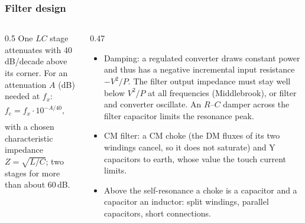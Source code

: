 \begin{frame}
	\frametitle{Filter design}
	\begin{columns}[T]
		\begin{column}{0.5\textwidth}
			\footnotesize
			One $LC$ stage attenuates with 40\,dB/decade above its corner. For an attenuation $A$ (dB) needed at $f_x$:
			\begin{equation*}
				f_\mathrm{c}=f_x\cdot10^{-A/40},\qquad L=\frac{Z}{2\pi f_\mathrm{c}},\quad C=\frac{1}{2\pi f_\mathrm{c}Z}
			\end{equation*}
			with a chosen characteristic impedance $Z=\sqrt{L/C}$; two stages for more than about 60\,dB.
		\end{column}
		\begin{column}{0.47\textwidth}
			\footnotesize
			\begin{itemize}
				\item Damping: a regulated converter draws constant power and thus has a negative incremental input resistance $-V^2/P$. The filter output impedance must stay well below $V^2/P$ at all frequencies (Middlebrook), or filter and converter oscillate. An $R$--$C$ damper across the filter capacitor limits the resonance peak.
				\item CM filter: a CM choke (the DM fluxes of its two windings cancel, so it does not saturate) and Y capacitors to earth, whose value the touch current limits.
				\item Above the self-resonance a choke is a capacitor and a capacitor an inductor: split windings, parallel capacitors, short connections.
			\end{itemize}
		\end{column}
	\end{columns}
\end{frame}


